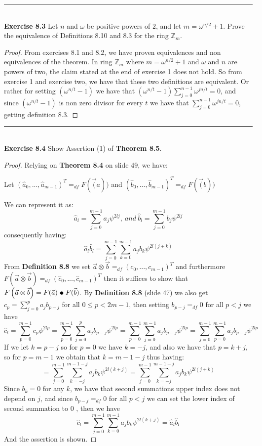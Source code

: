 \documentclass[a4paper]{article}
\begin{document}
\noindent\rule{12cm}{0.4pt}\\
\noindent \textbf{Exercise 8.3} Let $n$ and $\omega$ be positive powers of $2$, and let $m = \omega^{n/2} + 1$. Prove the equivalence of Definitions 8.10 and 8.3 for the ring $\mathbb{Z}_{m}$.
\begin{proof}
From exercises 8.1 and 8.2, we have proven equivalences and non equivalences of the theorem. In ring $\mathbb{Z}_{m}$ where $m=\omega^{n/2}+1$ and $\omega$ and $n$ are powers of two, the claim stated at the end of exercise 1 does not hold. So from exercise 1 and exercise two, we have that these two definitions are equivalent. Or rather for setting $(\omega^{n/t}-1)$ we have that $(\omega^{n/t}-1)\sum^{n-1}_{j=0}\omega^{jn/t}=0$, and since $(\omega^{n/t}-1)$ is non zero divisor for every $t$ we have that $\sum^{n-1}_{j=0}\omega^{jn/t}=0$, getting definition 8.3.
\end{proof}



\noindent\rule{12cm}{0.4pt}\\
\noindent \textbf{Exercise 8.4}  Show Assertion (1) of \textbf{Theorem 8.5}.
\begin{proof}
Relying on \textbf{Theorem 8.4} on slide 49, we have:
\begin{center}
Let $(\widehat{a}_0,...,\widehat{a}_{m-1})^{T} =_{df}F(\vec(a))$ and $(\widehat{b}_0,...,\widehat{b}_{m-1})^{T} =_{df}F(\vec(b))$
\end{center}
We can represent it as:
$$\widehat{a}_l = \sum_{j=0}^{m-1}a_j\psi^{2lj},\ and\ \widehat{b}_l = \sum_{j=0}^{m-1}b_j\psi^{2lj}$$
consequently having:
$$\widehat{a}_l\widehat{b}_l = \sum_{j=0}^{m-1}\sum_{k=0}^{m-1}a_jb_k\psi^{2l(j+k)}$$
From \textbf{Definition 8.8} we set $\vec{a} \otimes \vec{b} =_{df}(c_0,...,c_{m-1})^T$ and furthermore $F\left(\vec{a} \otimes \vec{b}\right) =_{df}(\widehat{c}_0,...,\widehat{c}_{m-1})^T$ then it suffices to show that $F\left(\vec{a} \otimes \vec{b}\right) = F(\vec{a})\ \tikz\draw[black,fill=black] (0,0) circle (.5ex);\ F(\vec{b})$. By \textbf{Definition 8.8} (slide 47) we also get $c_{p}=  \sum_{j=0}^{p}a_{j}b_{p-j}$ for all $ 0 \leq p < 2m-1$, then setting $b_{p-j} =_{df} 0$ for all $p < j$ we have
$$\widehat{c}_l = \sum_{p=0}^{m-1}c_p\psi^{2lp} =  \sum_{p=0}^{m-1}\sum_{j=0}^{p}a_{j}b_{p-j}\psi^{2lp} =  \sum_{p=0}^{m-1}\sum_{j=0}^{m-1}a_{j}b_{p-j}\psi^{2lp} =  \sum_{j=0}^{m-1}\sum_{p=0}^{m-1}a_{j}b_{p-j}\psi^{2lp}$$
If we let $k = p-j$ so for $p =0$ we have $ k = -j$, and also we have that $p=k+j$, so for $p = m - 1$ we obtain that $k = m - 1 - j$ thus having:
$$=  \sum_{j=0}^{m-1}\sum_{k= -j}^{m-1-j}a_{j}b_{k}\psi^{2l(k+j)} = \sum_{j=0}^{m-1}\sum_{k= -j}^{m-1-j}a_{j}b_{k}\psi^{2l(j+k)}$$
Since $b_{k}=0$ for any $k$, we have that second summations upper index does not depend on $j$, and since $b_{p-j} =_{df} 0$ for all $p < j$ we can set the lower index of second summation to 0 , then we have
$$\widehat{c}_l  =  \sum_{j=0}^{m-1}\sum_{k= 0}^{m-1}a_{j}b_{k}\psi^{2l(k+j)}=\widehat{a}_l\widehat{b}_l$$
And the assertion is shown.
\end{proof}
\end{document}
